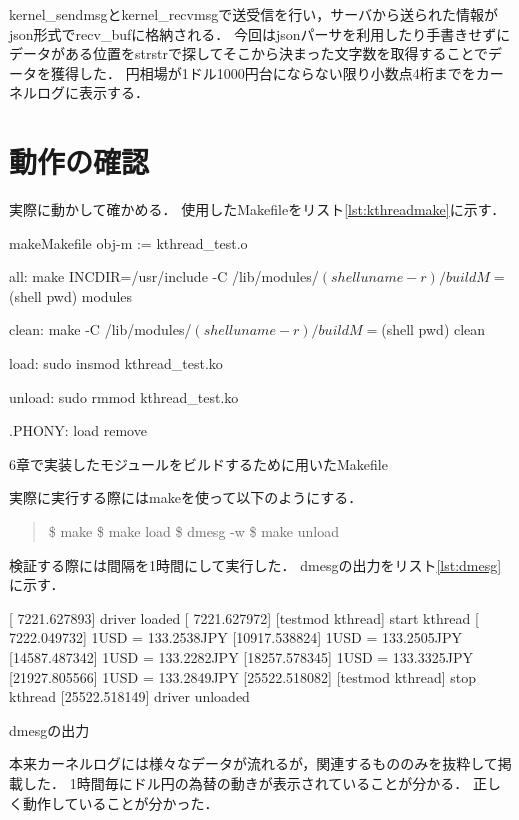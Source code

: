 kernel_sendmsgとkernel_recvmsgで送受信を行い，サーバから送られた情報がjson形式でrecv_bufに格納される．
今回はjsonパーサを利用したり手書きせずにデータがある位置をstrstrで探してそこから決まった文字数を取得することでデータを獲得した．
円相場が1ドル1000円台にならない限り小数点4桁までをカーネルログに表示する．


\section{動作の確認}
実際に動かして確かめる．
使用したMakefileをリスト\ref{lst:kthreadmake}に示す．
\begin{longlisting}
\begin{myminted}{make}{Makefile}
obj-m := kthread_test.o

all:
	make INCDIR=/usr/include -C /lib/modules/$(shell uname -r)/build M=$(shell pwd) modules

clean:
	make -C /lib/modules/$(shell uname -r)/build M=$(shell pwd) clean

load:
	sudo insmod kthread_test.ko

unload:
	sudo rmmod kthread_test.ko

.PHONY: load remove
\end{myminted}
\caption{6章で実装したモジュールをビルドするために用いたMakefile}
\label{lst:kthreadmake}
\end{longlisting}

実際に実行する際にはmakeを使って以下のようにする．
\begin{quote}
\$ make
\$ make load
\$ dmesg -w
\$ make unload
\end{quote}

検証する際には間隔を1時間にして実行した．
dmesgの出力をリスト\ref{lst:dmesg}に示す．
\begin{longlisting}
\begin{myminted}{}{}
[ 7221.627893] driver loaded
[ 7221.627972] [testmod kthread] start kthread
[ 7222.049732] 1USD = 133.2538JPY
[10917.538824] 1USD = 133.2505JPY
[14587.487342] 1USD = 133.2282JPY
[18257.578345] 1USD = 133.3325JPY
[21927.805566] 1USD = 133.2849JPY
[25522.518082] [testmod kthread] stop kthread
[25522.518149] driver unloaded
\end{myminted}
\caption{dmesgの出力}
\label{lst:dmesg}
\end{longlisting}

本来カーネルログには様々なデータが流れるが，関連するもののみを抜粋して掲載した．
1時間毎にドル円の為替の動きが表示されていることが分かる．
正しく動作していることが分かった．
